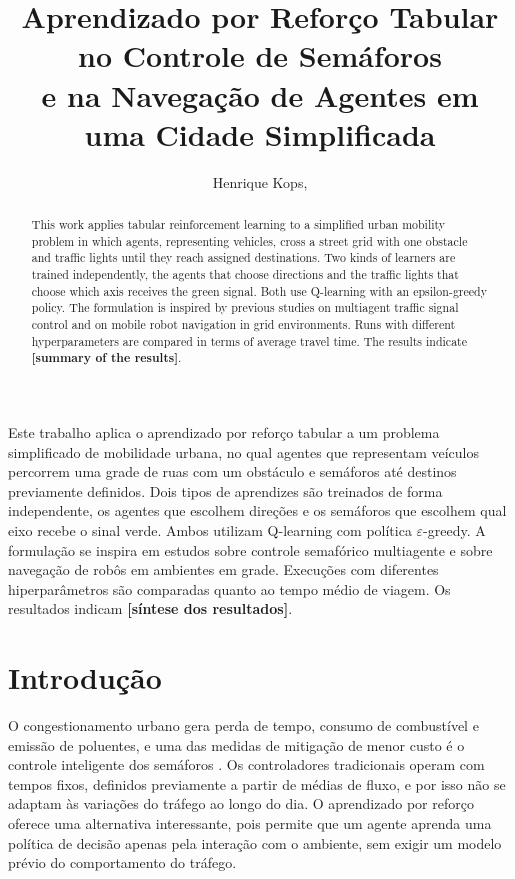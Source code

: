 \documentclass[12pt]{article}
\title{Aprendizado por Reforço Tabular no Controle de Semáforos\\ e na Navegação de Agentes em uma Cidade Simplificada}
\author{Henrique Kops\inst{1}, \pendente{demais autores}\inst{1}}
\newcommand{\pendente}[1]{\textbf{[#1]}}
\begin{document}
\maketitle

\begin{abstract}
  This work applies tabular reinforcement learning to a simplified urban mobility problem in which agents, representing
  vehicles, cross a street grid with one obstacle and traffic lights until they reach assigned destinations. Two kinds of
  learners are trained independently, the agents that choose directions and the traffic lights that choose which axis
  receives the green signal. Both use Q-learning with an epsilon-greedy policy. The formulation is inspired by previous
  studies on multiagent traffic signal control and on mobile robot navigation in grid environments. Runs with different
  hyperparameters are compared in terms of average travel time. The results indicate \pendente{summary of the results}.
\end{abstract}

\begin{resumo}
  Este trabalho aplica o aprendizado por reforço tabular a um problema simplificado de mobilidade urbana, no qual agentes
  que representam veículos percorrem uma grade de ruas com um obstáculo e semáforos até destinos previamente definidos.
  Dois tipos de aprendizes são treinados de forma independente, os agentes que escolhem direções e os semáforos que
  escolhem qual eixo recebe o sinal verde. Ambos utilizam Q-learning com política $\varepsilon$-greedy. A formulação se
  inspira em estudos sobre controle semafórico multiagente e sobre navegação de robôs em ambientes em grade. Execuções com
  diferentes hiperparâmetros são comparadas quanto ao tempo médio de viagem. Os resultados indicam \pendente{síntese dos resultados}.
\end{resumo}

\section{Introdução}

O congestionamento urbano gera perda de tempo, consumo de combustível e emissão de poluentes, e uma das medidas de
mitigação de menor custo é o controle inteligente dos semáforos \cite{Jin2011}. Os controladores tradicionais operam com tempos fixos,
definidos previamente a partir de médias de fluxo, e por isso não se adaptam às variações do tráfego ao longo do dia. O
aprendizado por reforço oferece uma alternativa interessante, pois permite que um agente aprenda uma política de decisão
apenas pela interação com o ambiente, sem exigir um modelo prévio do comportamento do tráfego.
\end{document}
